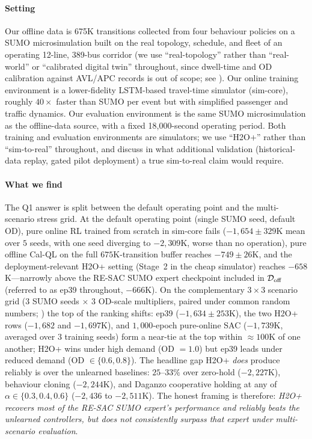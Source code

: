 \paragraph{Setting}
Our offline data is 675K transitions collected from four behaviour policies on a SUMO microsimulation built on the real topology, schedule, and fleet of an operating 12-line, 389-bus corridor (we use ``real-topology'' rather than ``real-world'' or ``calibrated digital twin'' throughout, since dwell-time and OD calibration against AVL/APC records is out of scope; see ).
Our online training environment is a lower-fidelity LSTM-based travel-time simulator (sim-core), roughly $40\times$ faster than SUMO per event but with simplified passenger and traffic dynamics.
Our evaluation environment is the same SUMO microsimulation as the offline-data source, with a fixed 18,000-second operating period.
Both training and evaluation environments are simulators; we use ``H2O+'' rather than ``sim-to-real'' throughout, and discuss in  what additional validation (historical-data replay, gated pilot deployment) a true sim-to-real claim would require.

\paragraph{What we find}
The Q1 answer is split between the default operating point and the multi-scenario stress grid.
At the default operating point (single SUMO seed, default OD), pure online RL trained from scratch in sim-core fails ($-1{,}654{\pm}329$K mean over $5$ seeds, with one seed diverging to $-2{,}309$K, worse than no operation), pure offline Cal-QL on the full $675$K-transition buffer reaches $-749{\pm}26$K, and the deployment-relevant H2O+ setting (Stage~2 in the cheap simulator) reaches $-658$K---narrowly above the RE-SAC SUMO expert checkpoint included in $\mathcal{D}_{\mathrm{off}}$ (referred to as ep39 throughout, $-666$K).
On the complementary $3 \times 3$ scenario grid ($3$ SUMO seeds $\times$ $3$ OD-scale multipliers, paired under common random numbers; ) the top of the ranking shifts: ep39 ($-1{,}634 \pm 253$K), the two H2O+ rows ($-1{,}682$ and $-1{,}697$K), and $1{,}000$-epoch pure-online SAC ($-1{,}739$K, averaged over $3$ training seeds) form a near-tie at the top within $\approx 100$K of one another; H2O+ wins under high demand (OD $= 1.0$) but ep39 leads under reduced demand (OD $\in \{0.6, 0.8\}$).
The headline gap H2O+ \emph{does} produce reliably is over the unlearned baselines: $25$--$33\%$ over zero-hold ($-2{,}227$K), behaviour cloning ($-2{,}244$K), and Daganzo cooperative holding at any of $\alpha \in \{0.3, 0.4, 0.6\}$ ($-2{,}436$ to $-2{,}511$K).
The honest framing is therefore: \emph{H2O+ recovers most of the RE-SAC SUMO expert's performance and reliably beats the unlearned controllers, but does not consistently surpass that expert under multi-scenario evaluation}.

